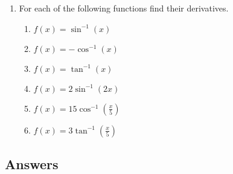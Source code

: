 \documentclass[a4paper,12pt]{article}
\begin{document}
\begin{enumerate}
\item For each of the following functions find their derivatives.
    \begin{multicols}{2}
    \begin{enumerate}
    \item \sspacer$f(x) = \sin^{-1}(x)$
    \item \sspacer$f(x) = -\cos^{-1}(x)$
    \item \sspacer$f(x) = \tan^{-1}(x)$
    \item \sspacer$f(x) = 2\sin^{-1}(2x)$
    \item \sspacer$f(x) = 15\cos^{-1}\left(\frac{x}{5}\right)$
    \item \sspacer$f(x) = 3\tan^{-1}\left(\frac{x}{5}\right)$
    \end{enumerate}
    \end{multicols}

\end{enumerate}
\newpage
\subsection*{Answers}
\end{document}
